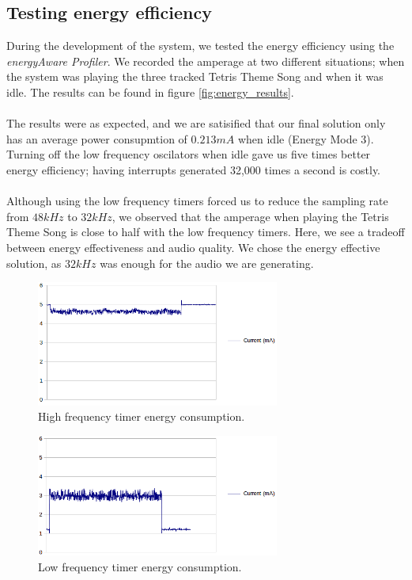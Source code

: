 \subsection{Testing energy efficiency}
During the development of the system, we tested the energy efficiency using the \emph{energyAware Profiler}. We recorded the amperage at two different situations; when the system was playing the three tracked Tetris Theme Song and when it was idle. The results can be found in figure \ref{fig:energy_results}. \\
\\
The results were as expected, and we are satisified that our final solution only has an average power consupmtion of $0.213mA$ when idle (Energy Mode 3). Turning off the low frequency oscilators when idle gave us five times better energy efficiency; having interrupts generated 32,000 times a second is costly.\\
\\
Although using the low frequency timers forced us to reduce the sampling rate from $48kHz$ to $32kHz$, we observed that the amperage when playing the Tetris Theme Song is close to half with the low frequency timers. Here, we see a tradeoff between energy effectiveness and audio quality. We chose the energy effective solution, as $32kHz$ was enough for the audio we are generating.

\begin{figure}[hf]
	\centering
	\includegraphics[width=8cm]{img/hf.png}
	\caption{High frequency timer energy consumption.}
	\label{fig:hf}
\end{figure}
	
\begin{figure}[hf]
	\centering
	\includegraphics[width=8cm]{img/em3.png}
	\caption{Low frequency timer energy consumption.}
	\label{fig:em3}
\end{figure}


